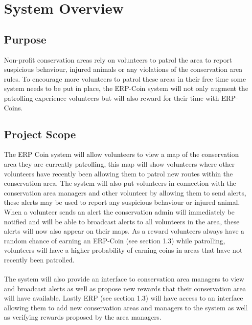 \documentclass{article}
\begin{document}
\section{System Overview}

\subsection{Purpose}
Non-profit conservation areas rely on volunteers to patrol the area to report suspicious behaviour, injured animals or any violations of the conservation area rules. To encourage more volunteers to patrol these areas in their free time some system needs to be put in place, the ERP-Coin system will not only augment the patrolling experience volunteers but will also reward for their time with ERP-Coins.
 
\subsection{Project Scope}
The ERP Coin system will allow volunteers to view a map of the conservation area they are currently patrolling, this map will show volunteers where other volunteers have recently been allowing them to patrol new routes within the conservation area. The system will also put volunteers in connection with the conservation area managers and other volunteer by allowing them to send alerts, these alerts may be used to report any suspicious behaviour or injured animal. When a volunteer sends an alert the conservation admin will immediately be notified and will be able to broadcast alerts to all volunteers in the area, these alerts will now also appear on their maps. As a reward volunteers always have a random chance of earning an ERP-Coin (see section 1.3) while patrolling, volunteers will have a higher probability of earning coins in areas that have not recently been patrolled.\\\\The system will also provide an interface to conservation area managers to view and broadcast alerts as well as propose new rewards that their conservation area will have available. Lastly ERP (see section 1.3) will have access to an interface allowing them to add new conservation areas and managers to the system as well as verifying rewards proposed by the area managers.
\vspace{2em}
\end{document}
